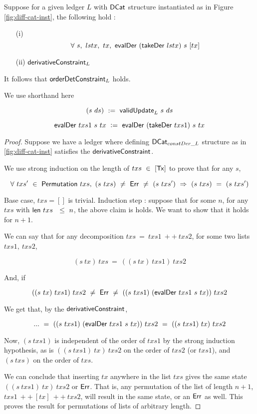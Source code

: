 \begin{theorem}
\label{the:state-det}
  Suppose for a given ledger $L$ with $\mathsf{DCat}$ structure instantiated as in
  Figure \ref{fig:diff-cat-inst}, the following hold :

  \begin{itemize}
    \item[(i)] \[ \forall~s,~lstx,~tx,~\mathsf{evalDer} ~(\mathsf{takeDer}~ lstx) ~s~ [tx] \]
    \item[(ii)] $\mathsf{derivativeConstraint}_L$
  \end{itemize}

  It follows that $\mathsf{orderDetConstraint}_L$ holds.

\end{theorem}

We use shorthand here

\[ (s~ds)~:=~\mathsf{validUpdate}_L~ s~ ds \]

\[ \mathsf{evalDer} ~txs1 ~s~ tx~ \mathrel{\mathop:}= ~\mathsf{evalDer} ~(\mathsf{takeDer}~ txs1) ~s~ tx \]

\begin{proof}

Suppose we have a ledger where defining $\mathsf{DCat}_{constDer\_L}$ structure as in \ref{fig:diff-cat-inst}
satisfies the $\mathsf{derivativeConstraint}$.

We use strong induction on the length of $txs~\in~[\mathsf{Tx}]$ to prove that for any $s$,

\[ \forall~txs'~\in~\mathsf{Permutation}~txs,~(s~txs)~\neq~\mathsf{Err}~\neq~(s~txs')~\Rightarrow~ (s~txs)~=~(s~txs') \]

Base case, $txs = []$ is trivial.
Induction step : suppose that for some $n$, for any $txs$ with $\mathsf{len}~txs~~\leq~n$,
the above claim is holds. We want to show that it holds for $n+1$.

We can say that for any decomposition $txs~=~txs1~++~txs2$, for some two lists $txs1,~txs2$,

\[ (s~tx)~txs ~=~((s~tx)~txs1)~txs2 \]

And, if

\[((s~tx)~txs1)~txs2~\neq~\mathsf{Err}~\neq~((s~txs1)~(\mathsf{evalDer} ~txs1 ~s~ tx))~txs2 \]

We get that, by the $\mathsf{derivativeConstraint}$,

\[ ... ~=~ ((s~txs1)~(\mathsf{evalDer} ~txs1 ~s~ tx))~txs2~=~((s~txs1)~tx)~txs2 \]

Now, $(s~txs1)$ is independent of the order of $txs1$ by the strong induction hypothesis,
as is $((s~txs1)~tx)~txs2$ on the order of $txs2$ (or $txs1$), and
$(s~txs)$ on the order of $txs$.

We can conclude that inserting $tx$ anywhere in the list $txs$ gives the same
state $((s~txs1)~tx)~txs2$ or $\mathsf{Err}$. That is,
any permutation of the list of length $n+1$, $txs1~++~[tx]~++~txs2$,
will result in the same state, or an $\mathsf{Err}$ as well. This proves the
result for permutations of lists of arbitrary length.

\end{proof}


